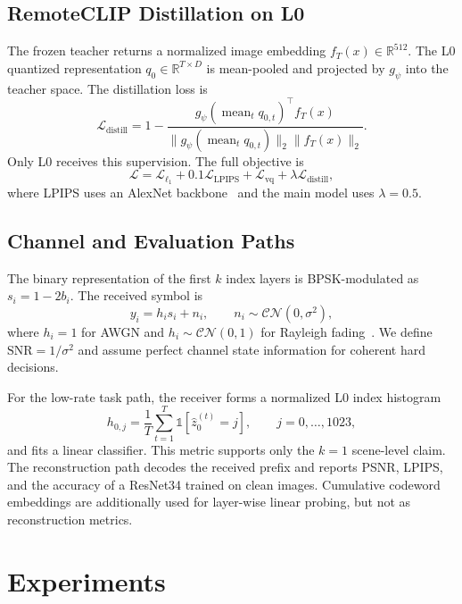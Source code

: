 \documentclass[letterpaper,journal]{IEEEtran}
\newcommand{\snr}{\mathrm{SNR}}
\begin{document}
\subsection{RemoteCLIP Distillation on L0}
The frozen teacher returns a normalized image embedding $f_T(x)\in\mathbb{R}^{512}$. The L0 quantized representation $q_0\in\mathbb{R}^{T\times D}$ is mean-pooled and projected by $g_\psi$ into the teacher space. The distillation loss is
\begin{equation}
\mathcal{L}_{\mathrm{distill}}=1-
\frac{g_\psi(\operatorname{mean}_t q_{0,t})^\top f_T(x)}
{\|g_\psi(\operatorname{mean}_t q_{0,t})\|_2\|f_T(x)\|_2}.
\end{equation}
Only L0 receives this supervision. The full objective is
\begin{equation}
\mathcal{L}=\mathcal{L}_{\ell_1}+0.1\mathcal{L}_{\mathrm{LPIPS}}+
\mathcal{L}_{\mathrm{vq}}+\lambda\mathcal{L}_{\mathrm{distill}},
\end{equation}
where LPIPS uses an AlexNet backbone~\cite{zhang2018lpips} and the main model uses $\lambda=0.5$.

\subsection{Channel and Evaluation Paths}
The binary representation of the first $k$ index layers is BPSK-modulated as $s_i=1-2b_i$. The received symbol is
\begin{equation}
y_i=h_i s_i+n_i,\qquad n_i\sim\mathcal{CN}(0,\sigma^2),
\end{equation}
where $h_i=1$ for AWGN and $h_i\sim\mathcal{CN}(0,1)$ for Rayleigh fading~\cite{proakis}. We define $\snr=1/\sigma^2$ and assume perfect channel state information for coherent hard decisions.

For the low-rate task path, the receiver forms a normalized L0 index histogram
\begin{equation}
h_{0,j}=\frac{1}{T}\sum_{t=1}^{T}\mathbb{1}[\hat z_0^{(t)}=j],
\qquad j=0,\ldots,1023,
\end{equation}
and fits a linear classifier. This metric supports only the $k=1$ scene-level claim. The reconstruction path decodes the received prefix and reports PSNR, LPIPS, and the accuracy of a ResNet34 trained on clean images. Cumulative codeword embeddings are additionally used for layer-wise linear probing, but not as reconstruction metrics.

\section{Experiments}
\label{sec:experiments}
\end{document}
